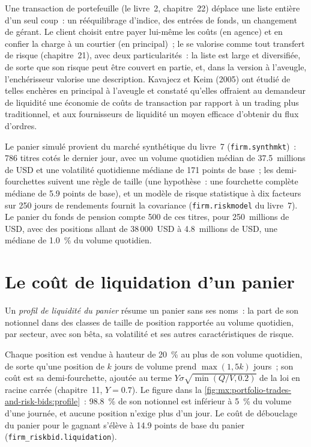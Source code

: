 Une transaction de portefeuille (le livre~2, chapitre~22) déplace une liste entière d'un seul coup~: un rééquilibrage d'indice, des entrées de fonds, un changement de gérant. Le client
choisit entre payer lui-même les coûts (en agence) et en confier la charge à un courtier (en principal)~; le  se valorise comme tout transfert de risque
(chapitre~21), avec deux particularités~: la liste est large et diversifiée, de sorte que son risque peut être couvert en partie, et, dans la version à l'aveugle, l'enchérisseur valorise
une description. Kavajecz et Keim (2005) ont étudié de telles enchères en principal à l'aveugle et constaté qu'elles offraient au demandeur de liquidité une économie de coûts de transaction
par rapport à un trading plus traditionnel, et aux fournisseurs de liquidité un moyen efficace d'obtenir du flux d'ordres.

Le panier simulé provient du marché synthétique du livre~7 (\texttt{firm.synthmkt})~: 786 titres cotés le dernier jour, avec un volume quotidien médian de
37.5~millions de USD et une volatilité quotidienne médiane de 171 points de base~; les demi-fourchettes suivent une règle de taille (une hypothèse~: une fourchette complète médiane de 5.9 points
de base), et un modèle de risque statistique à dix facteurs sur 250 jours de rendements fournit la covariance (\texttt{firm.riskmodel} du livre~7). Le panier du fonds de pension
compte 500 de ces titres, pour 250~millions de USD, avec des positions allant de 38\,000~USD à 4.8~millions de USD, une médiane de 1.0~\% du volume quotidien.

\section{Le coût de liquidation d'un panier}

\begin{definition}\label{def:mx:portfolio-trades-and-risk-bids:profile}
Un \emph{profil de liquidité du panier} résume un panier sans ses noms~: la part de son notionnel dans des classes de taille de position
rapportée au volume quotidien, par secteur, avec son bêta, sa volatilité et ses autres caractéristiques de risque.
\end{definition}

Chaque position est vendue à hauteur de 20~\% au plus de son volume quotidien, de sorte qu'une position de $k$ jours de volume prend $\max(1,5k)$ jours~; son coût est sa
demi-fourchette, ajoutée au terme $Y\sigma\sqrt{\min(Q/V,0.2)}$ de la loi en racine carrée (chapitre~11, $Y=0.7$). Le  figure dans la
\cref{fig:mx:portfolio-trades-and-risk-bids:profile}~: 98.8~\% de son notionnel est inférieur à 5~\% du volume d'une journée, et aucune position n'exige plus d'un jour. Le
coût de débouclage du panier pour le gagnant s'élève à 14.9 points de base du panier (\texttt{firm\_riskbid.liquidation}).

